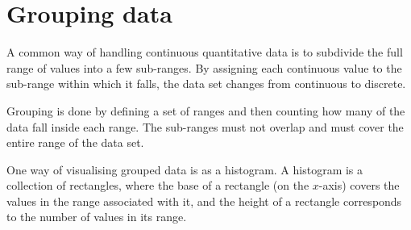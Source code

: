 \section{Grouping data}
\label{sec:statistics_grouping_data}
A common way of handling continuous quantitative data is to subdivide
the full range of values into a few sub-ranges.
By assigning each continuous value to the sub-range within which it
falls, the data set changes from continuous to discrete.\par
Grouping is done by defining a set of ranges and then counting how
many of the data fall inside each range. The sub-ranges must
 not overlap and must cover the entire
range of the data set.\par

One way of visualising grouped data is as a histogram. A histogram is
a collection of rectangles, where the base of a rectangle (on the
$x$-axis) covers the values in the range associated with it, and the
height of a rectangle corresponds to the number of values in its
range.

